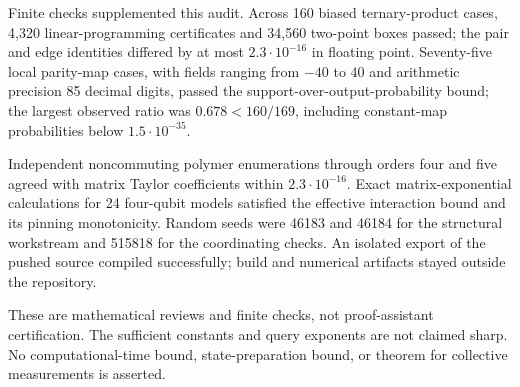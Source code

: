 Finite checks supplemented this audit. Across 160 biased ternary-product
cases, 4,320 linear-programming certificates and 34,560 two-point boxes
passed; the pair and edge identities differed by at most
$2.3\cdot10^{-16}$ in floating point. Seventy-five local parity-map
cases, with fields ranging from $-40$ to $40$ and arithmetic precision
85 decimal digits, passed the support-over-output-probability bound;
the largest observed ratio was $0.678<160/169$, including constant-map
probabilities below $1.5\cdot10^{-35}$.

Independent noncommuting polymer enumerations through orders four and
five agreed with matrix Taylor coefficients within
$2.3\cdot10^{-16}$. Exact matrix-exponential calculations for 24
four-qubit models satisfied the effective interaction bound and its
pinning monotonicity. Random seeds were 46183 and 46184 for the
structural workstream and 515818 for the coordinating checks.
An isolated export of the pushed source compiled successfully; build
and numerical artifacts stayed outside the repository.

These are mathematical reviews and finite checks, not proof-assistant
certification. The sufficient constants and query exponents are not
claimed sharp. No computational-time bound, state-preparation bound,
or theorem for collective measurements is asserted.
